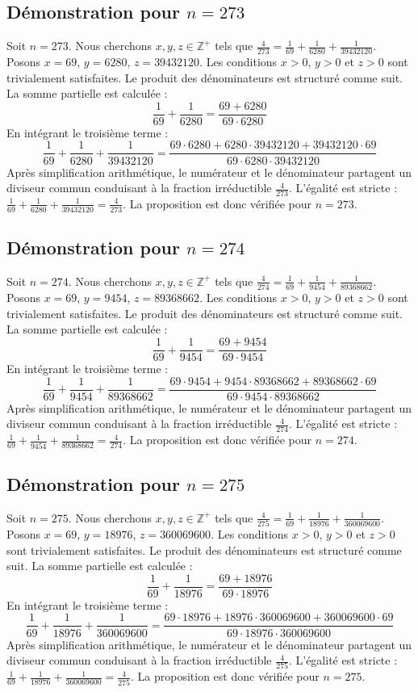 \documentclass[11pt,a4paper]{article}
\begin{document}
\subsection{Démonstration pour $n = 273$}
Soit $n = 273$. Nous cherchons $x, y, z \in \mathbb{Z}^{+}$ tels que $\frac{4}{273} = \frac{1}{69} + \frac{1}{6280} + \frac{1}{39432120}$.
Posons $x = 69$, $y = 6280$, $z = 39432120$.
Les conditions $x > 0$, $y > 0$ et $z > 0$ sont trivialement satisfaites.
Le produit des dénominateurs est structuré comme suit. La somme partielle est calculée :
$$ \frac{1}{69} + \frac{1}{6280} = \frac{69+6280}{69 \cdot 6280} $$
En intégrant le troisième terme :
$$ \frac{1}{69} + \frac{1}{6280} + \frac{1}{39432120} = \frac{69 \cdot 6280 + 6280 \cdot 39432120 + 39432120 \cdot 69}{69 \cdot 6280 \cdot 39432120} $$
Après simplification arithmétique, le numérateur et le dénominateur partagent un diviseur commun conduisant à la fraction irréductible $\frac{4}{273}$.
L'égalité est stricte : $\frac{1}{69} + \frac{1}{6280} + \frac{1}{39432120} = \frac{4}{273}$.
La proposition est donc vérifiée pour $n = 273$.
\subsection{Démonstration pour $n = 274$}
Soit $n = 274$. Nous cherchons $x, y, z \in \mathbb{Z}^{+}$ tels que $\frac{4}{274} = \frac{1}{69} + \frac{1}{9454} + \frac{1}{89368662}$.
Posons $x = 69$, $y = 9454$, $z = 89368662$.
Les conditions $x > 0$, $y > 0$ et $z > 0$ sont trivialement satisfaites.
Le produit des dénominateurs est structuré comme suit. La somme partielle est calculée :
$$ \frac{1}{69} + \frac{1}{9454} = \frac{69+9454}{69 \cdot 9454} $$
En intégrant le troisième terme :
$$ \frac{1}{69} + \frac{1}{9454} + \frac{1}{89368662} = \frac{69 \cdot 9454 + 9454 \cdot 89368662 + 89368662 \cdot 69}{69 \cdot 9454 \cdot 89368662} $$
Après simplification arithmétique, le numérateur et le dénominateur partagent un diviseur commun conduisant à la fraction irréductible $\frac{4}{274}$.
L'égalité est stricte : $\frac{1}{69} + \frac{1}{9454} + \frac{1}{89368662} = \frac{4}{274}$.
La proposition est donc vérifiée pour $n = 274$.
\subsection{Démonstration pour $n = 275$}
Soit $n = 275$. Nous cherchons $x, y, z \in \mathbb{Z}^{+}$ tels que $\frac{4}{275} = \frac{1}{69} + \frac{1}{18976} + \frac{1}{360069600}$.
Posons $x = 69$, $y = 18976$, $z = 360069600$.
Les conditions $x > 0$, $y > 0$ et $z > 0$ sont trivialement satisfaites.
Le produit des dénominateurs est structuré comme suit. La somme partielle est calculée :
$$ \frac{1}{69} + \frac{1}{18976} = \frac{69+18976}{69 \cdot 18976} $$
En intégrant le troisième terme :
$$ \frac{1}{69} + \frac{1}{18976} + \frac{1}{360069600} = \frac{69 \cdot 18976 + 18976 \cdot 360069600 + 360069600 \cdot 69}{69 \cdot 18976 \cdot 360069600} $$
Après simplification arithmétique, le numérateur et le dénominateur partagent un diviseur commun conduisant à la fraction irréductible $\frac{4}{275}$.
L'égalité est stricte : $\frac{1}{69} + \frac{1}{18976} + \frac{1}{360069600} = \frac{4}{275}$.
La proposition est donc vérifiée pour $n = 275$.
\end{document}
